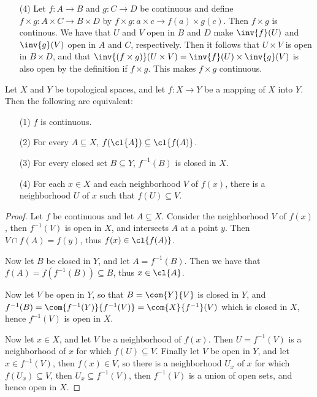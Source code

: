 \begin{example}
\begin{enumerate}
        \item[(4)] Let $f:A \rightarrow B$ and $g:C \rightarrow D$ be continuous
            and define $f \times g:A \times C \rightarrow B \times D$ by $f
            \times g:a \times c \rightarrow f(a) \times g(c)$. Then $f \times g$
            is continous. We have that  $U$ and  $V$ open in $B$ and $D$ make
            $\inv{f}(U)$ and $\inv{g}(V)$ open in $A$ and  $C$, respectively.
            Then it follows that  $U \times V$ is open in  $B \times D$, and
            that  $\inv{(f \times g)}(U \times V)=\inv{f}(U) \times \inv{g}(V)$
            is also open by the definition if $f \times g$. This makes
            $f \times g$ continuous.
    \end{enumerate}
\end{example}

\begin{theorem}\label{1.7.1}
    Let $X$ and  $Y$ be topological spaces, and let  $f:X \rightarrow Y$ be a mapping of  $X$ into
    $Y$. Then the following are equivalent:
        \begin{enumerate}
            \item[(1)] $f$ is continuous.

            \item[(2)] For every $A \subseteq X$,  $f(\cl{A}) \subseteq \cl{f(A)}$.

            \item[(3)] For every closed set $B \subseteq Y$,  $f^{-1}(B)$ is closed in $X$.

            \item[(4)] For each  $x \in X$ and each neighborhood  $V$ of
                $f(x)$, there is a neighborhood $U$ of  $x$ such that
                $f(U) \subseteq V$.
        \end{enumerate}
\end{theorem}
\begin{proof}
    Let $f$ be continuous and let  $A \subseteq X$. Consider the neighborhood  $V$ of  $f(x)$, then
    $f^{-1}(V)$ is open in $X$, and intersects  $A$ at a point  $y$. Then  $V \cap f(A)=f(y)$, thus
    $f(x) \in \cl{f(A)}$.

    Now let $B$ be closed in  $Y$, and let  $A=f^{-1}(B)$. Then we have that
    $f(A)=f(f^{-1}(B))
    \subseteq B$, thus $x \in \cl{A}$.

    Now let $V$ be open in $Y$, so that  $B=\com{Y}{V}$ is closed in $Y$, and
    $f^{-1}(B)=\com{f^{-1}(Y)}{f^{-1}(V)}=\com{X}{f^{-1}}(V)$ which is closed in $X$, hence
    $f^{-1}(V)$ is open in $X$.

    Now let  $x \in X$, and let  $V$ be a neighborhood of  $f(x)$. Then $U=f^{-1}(V)$ is a
    neighborhood of $x$ for which  $f(U) \subseteq V$. Finally let $V$ be open in  $Y$, and let $x
    \in f^{-1}(V)$, then $f(x) \in V$, so  there is a neighborhood $U_x$ of  $x$ for which  $f(U_x) \subseteq V$,
    then $U_x \subseteq f^{-1}(V)$, then $f^{-1}(V)$ is a union of open sets, and hence open in $X$.
\end{proof}

